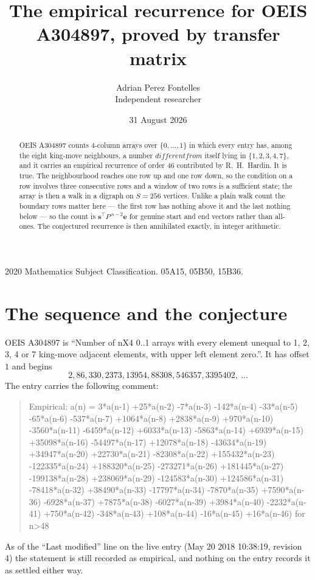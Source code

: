 \documentclass[11pt,a4paper]{article}
\title{The empirical recurrence for OEIS A304897, proved by transfer matrix}
\author{Adrian Perez Fontelles\\ \small Independent researcher}
\date{31 August 2026}
\theoremstyle{plain}
\theoremstyle{definition}
\begin{document}
\maketitle

\begin{abstract}
OEIS A304897 counts $4$-column arrays over $\{0,\dots,1\}$ in which every entry has,
among the eight king-move neighbours, a number $different from$ itself lying in $\{1,2,3,4,7\}$, and it carries an empirical
recurrence of order $46$ contributed by R.~H.~Hardin. It is true. The neighbourhood
reaches one row up and one row down, so the condition on a row involves three consecutive
rows and a window of two rows is a sufficient state; the array is then a walk in a digraph
on $S=256$ vertices. Unlike a plain walk count the boundary rows matter here --- the first
row has nothing above it and the last nothing below --- so the count is
$\mathbf{s}^{\!\top}P^{\,n-2}\mathbf{e}$ for genuine start and end vectors rather than
all-ones. The conjectured recurrence is then annihilated exactly, in integer arithmetic.
\end{abstract}

\noindent\small 2020 Mathematics Subject Classification. 05A15, 05B50, 15B36.\normalsize

\section{The sequence and the conjecture}

OEIS A304897 is ``Number of nX4 0..1 arrays with every element unequal to 1, 2, 3, 4 or 7 king-move adjacent elements, with upper left element zero.''. It has offset
$1$ and begins
\[
2, 86, 330, 2373, 13954, 88308, 546357, 3395402,\ \dots
\]
The entry carries the following comment:
\begin{quote}\small
Empirical: a(n) = 3*a(n-1) +25*a(n-2) -7*a(n-3) -142*a(n-4) -33*a(n-5) -65*a(n-6) -537*a(n-7) +1064*a(n-8) +2838*a(n-9) +970*a(n-10) -3560*a(n-11) -6459*a(n-12) +6033*a(n-13) -5863*a(n-14) +6939*a(n-15) +35098*a(n-16) -54497*a(n-17) +12078*a(n-18) -43634*a(n-19) +34947*a(n-20) +22730*a(n-21) -82308*a(n-22) +155432*a(n-23) -122335*a(n-24) +188320*a(n-25) -273271*a(n-26) +181445*a(n-27) -199138*a(n-28) +238069*a(n-29) -124583*a(n-30) +124586*a(n-31) -78418*a(n-32) +38490*a(n-33) -17797*a(n-34) -7870*a(n-35) +7590*a(n-36) -6928*a(n-37) +7875*a(n-38) -6027*a(n-39) +3984*a(n-40) -2232*a(n-41) +750*a(n-42) -348*a(n-43) +108*a(n-44) -16*a(n-45) +16*a(n-46) for n>48
\end{quote}
As of the ``Last modified'' line on the live entry (May 20 2018 10:38:19, revision
4) the statement is still recorded as empirical, and nothing on the entry
records it as settled either way.
\end{document}
